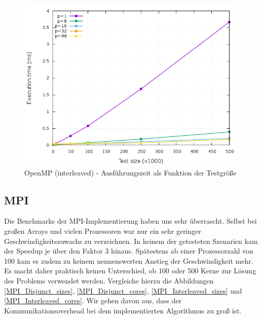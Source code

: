 \begin{figure}[p]
	\centering
	\includegraphics[width=404pt]{resources/plots/OpenMP_Interleaved_cores.png}
	\caption{OpenMP (interleaved) - Ausführungszeit als Funktion der Testgröße}
	\label{OpenMP_Interleaved_cores}
\end{figure}



\subsection{MPI}
Die Benchmarks der MPI-Implementierung haben uns sehr überrascht.
Selbst bei großen Arrays und vielen Prozessoren war nur ein sehr geringer Geschwindigkeitszuwachs zu verzeichnen.
In keinem der getesteten Szenarien kam der Speedup je über den Faktor 3 hinaus.
Spätestens ab einer Prozessorzahl von 100 kam es zudem zu keinem nennenswerten Anstieg der Geschwindigkeit mehr.
Es macht daher praktisch keinen Unterschied, ob 100 oder 500 Kerne zur Lösung des Problems verwendet werden.
Vergleiche hierzu die Abbildungen \ref{MPI_Disjunct_sizes}, \ref{MPI_Disjunct_cores}, \ref{MPI_Interleaved_sizes} und \ref{MPI_Interleaved_cores}.
Wir gehen davon aus, dass der Kommunikationsoverhead bei dem implementierten Algorithmus zu groß ist.


